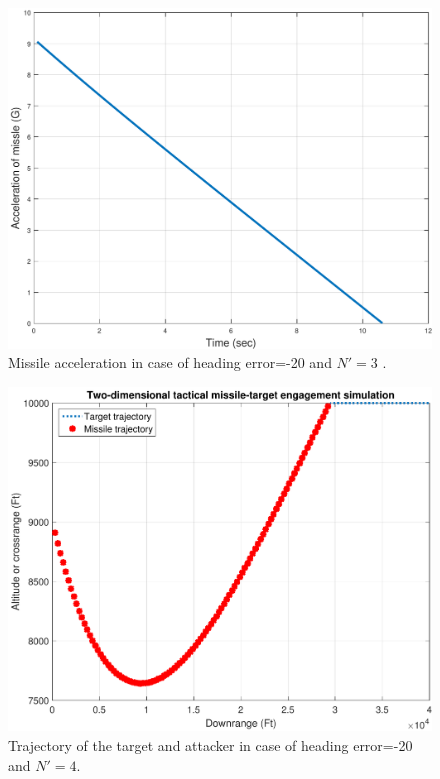 \begin{figure}[htb]
	\centering
	\includegraphics[scale = 0.75]{fig/MissileAcceleration20N3.pdf}
	\caption{Missile acceleration in case of heading error=-20 and $N'=3$ .}
	\label{missile acceleration20N3}
\end{figure}


\begin{figure}[htb]
	\centering
	\includegraphics[scale = 0.75]{fig/trajectory20N4.pdf}
	\caption{Trajectory of the target and attacker in case of heading error=-20 and $N'=4$.}
	\label{trajectory20N4}
\end{figure}



